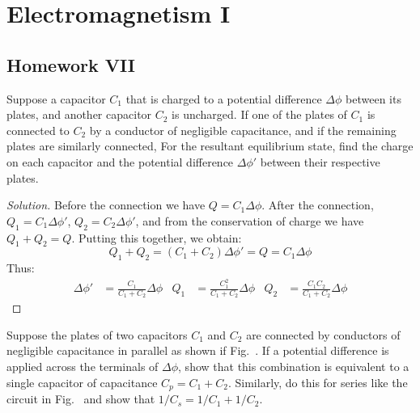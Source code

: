 \documentclass[crop=false,class=article,oneside]{standalone}
\begin{document}
    \ifx\ifphysicscourseselectromagnetismI\undefined
        \section*{Electromagnetism I}
        \setcounter{section}{7}
        \renewcommand\thefigure{%
            \arabic{section}.\arabic{figure}%
        }
        \renewcommand\thesubfigure{%
            \arabic{section}.\arabic{figure}.\arabic{subfigure}%
        }
    \fi
    \subsection{Homework VII}
        \begin{problem}[Wangsness 6-6]
            Suppose a capacitor $C_{1}$ that is charged
            to a potential difference $\Delta\phi$
            between its plates, and another capacitor
            $C_{2}$ is uncharged. If one of the plates
            of $C_{1}$ is connected to $C_{2}$ by
            a conductor of negligible capacitance, and
            if the remaining plates are similarly connected,
            For the resultant equilibrium state, find the
            charge on each capacitor and the potential
            difference $\Delta\phi'$ between their respective
            plates.
        \end{problem}
        \begin{proof}[Solution]
            Before the connection we have
            $Q=C_{1}\Delta\phi$.
            After the connection, $Q_{1}=C_{1}\Delta\phi'$,
            $Q_{2}=C_{2}\Delta\phi'$, and from the
            conservation of charge we have $Q_{1}+Q_{2}=Q$.
            Putting this together, we obtain:
            \begin{equation*}
                Q_{1}+Q_{2}
                =(C_{1}+C_{2})\Delta\phi'
                =Q
                =C_{1}\Delta\phi
            \end{equation*}
            Thus:
            \begin{align*}
                \Delta\phi'
                &=\frac{C_{1}}{C_{1}+C_{2}}\Delta\phi
                &
                Q_{1}
                &=\frac{C_{1}^{2}}{C_{1}+C_{2}}\Delta\phi
                &
                Q_{2}
                &=\frac{C_{1}C_{2}}{C_{1}+C_{2}}\Delta\phi
            \end{align*}
        \end{proof}
        \begin{problem}[Wangsness 6-7]
            \label{Problem:EMAG_Wangsness_6_7}
            Suppose the plates of two capacitors
            $C_{1}$ and $C_{2}$ are connected by conductors
            of negligible capacitance in parallel as shown
            if Fig.~.
            If a potential difference is applied across the
            terminals of $\Delta\phi$, show that this
            combination is equivalent to a single capacitor
            of capacitance $C_{p}=C_{1}+C_{2}$. Similarly, do
            this for series like the circuit in
            Fig.~ and show
            that $1/C_{s}=1/C_{1}+1/C_{2}$.
        \end{problem}
\end{document}
